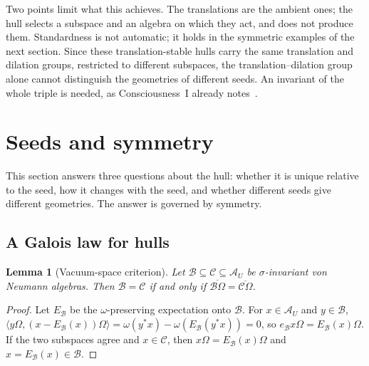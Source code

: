 \documentclass[12pt]{article}
\newtheorem{lemma}[theorem]{Lemma}
\theoremstyle{definition}
\theoremstyle{remark}
\newcommand{\AU}{\mathcal A_U}
\begin{document}
Two points limit what this achieves. The translations are the ambient ones; the hull
selects a subspace and an algebra on which they act, and does not produce them.
Standardness is not automatic; it holds in the symmetric examples of the next section.
Since these translation-stable hulls carry the same translation and dilation groups, restricted to
different subspaces, the translation--dilation group alone cannot distinguish the
geometries of different seeds. An invariant of the whole triple is needed, as
Consciousness~I already notes~\cite{PaperI}.

\section{Seeds and symmetry}\label{sec:symmetry}

This section answers three questions about the hull: whether it is unique relative to
the seed, how it changes with the seed, and whether different seeds give different
geometries. The answer is governed by symmetry.

\subsection{A Galois law for hulls}

\begin{lemma}[Vacuum-space criterion]\label{lem:vacspace}
Let \(\mathcal B\subseteq\mathcal C\subseteq\AU\) be \(\sigma\)-invariant von Neumann
algebras. Then \(\mathcal B=\mathcal C\) if and only if
\(\overline{\mathcal B\Omega}=\overline{\mathcal C\Omega}\).
\end{lemma}

\begin{proof}
Let \(E_{\mathcal B}\) be the \(\omega\)-preserving expectation onto \(\mathcal B\). For
\(x\in\AU\) and \(y\in\mathcal B\),
\(\langle y\Omega,(x-E_{\mathcal B}(x))\Omega\rangle=\omega(y^*x)-\omega(E_{\mathcal B}(y^*x))=0\),
so \(e_{\mathcal B}x\Omega=E_{\mathcal B}(x)\Omega\). If the two subspaces agree and
\(x\in\mathcal C\), then \(x\Omega=E_{\mathcal B}(x)\Omega\) and \(x=E_{\mathcal B}(x)\in\mathcal B\).
\end{proof}
\end{document}
